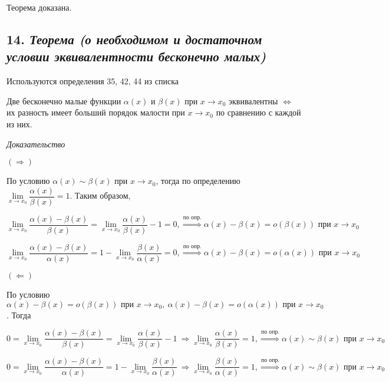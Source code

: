 Теорема доказана.
\newpage 
\subsection*{14. \textit{Теорема (о необходимом и достаточном условии эквивалентности бесконечно малых)}}
\begin{Quote2} 
\small\centering 

Используются определения 35, 42, 44 из списка \end{Quote2} 

Две бесконечно малые функции $\alpha(x)$ и $\beta(x)$ при $x \rightarrow x_0$ эквивалентны $\iff$ их разность имеет больший порядок малости при $x \rightarrow x_0$ по сравнению с каждой из них.
\vspace*{20pt} 

\textit{Доказательство}

$(\Rightarrow)$

По условию $\alpha(x) \sim \beta(x)$ при $x \rightarrow x_0$, тогда по определению $\lim\limits_{x \to x_0}{\dfrac{\alpha(x)}{\beta(x)}} = 1$. Таким образом,

$$
\lim\limits_{x \to x_0}{\dfrac{\alpha(x) - \beta(x)}{\beta(x)}} = \lim\limits_{x \to x_0}{\dfrac{\alpha(x)}{\beta(x)}} - 1 = 0, \overset{\text{по опр.}}\Rightarrow \alpha(x) - \beta(x) = o (\beta(x)) \text{ при } x \rightarrow x_0
$$

$$
\lim\limits_{x \to x_0}{\dfrac{\alpha(x) - \beta(x)}{\alpha(x)}} = 1 - \lim\limits_{x \to x_0}{\dfrac{\beta(x)}{\alpha(x)}} = 0, \overset{\text{по опр.}}\Rightarrow \alpha(x) - \beta(x) = o (\alpha(x)) \text{ при } x \rightarrow x_0
$$

$(\Leftarrow)$

По условию $\alpha(x) - \beta(x) = o (\beta(x)) \text{ при } x \rightarrow x_0, \ \alpha(x) - \beta(x) = o (\alpha(x)) \text{ при } x \rightarrow x_0$. Тогда

$$
0 = \lim\limits_{x \to x_0}{\dfrac{\alpha(x) - \beta(x)}{\beta(x)}} = \lim\limits_{x \to x_0}{\dfrac{\alpha(x)}{\beta(x)}} - 1 \ \Rightarrow \lim\limits_{x \to x_0}{\dfrac{\alpha(x)}{\beta(x)}} = 1, \overset{\text{по опр.}}\Rightarrow \alpha(x) \sim \beta(x) \text{ при } x \rightarrow x_0
$$

$$
0 = \lim\limits_{x \to x_0}{\dfrac{\alpha(x) - \beta(x)}{\alpha(x)}} = 1 - \lim\limits_{x \to x_0}{\dfrac{\beta(x)}{\alpha(x)}} \ \Rightarrow \lim\limits_{x \to x_0}{\dfrac{\beta(x)}{\alpha(x)}} = 1, \overset{\text{по опр.}}\Rightarrow \alpha(x) \sim \beta(x) \text{ при } x \rightarrow x_0
$$


